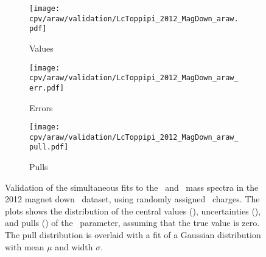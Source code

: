 \begin{figure}
  \begin{subfigure}[t]{0.32\textwidth}
    \texttt{[image: cpv/araw/validation/LcToppipi\_2012\_MagDown\_araw.pdf]}
    \caption{Values}
    \label{fig:cpv:araw:validation:null:ppipi:values}
  \end{subfigure}
  \begin{subfigure}[t]{0.32\textwidth}
    \texttt{[image: cpv/araw/validation/LcToppipi\_2012\_MagDown\_araw\_err.pdf]}
    \caption{Errors}
    \label{fig:cpv:araw:validation:null:ppipi:errors}
  \end{subfigure}
  \begin{subfigure}[t]{0.32\textwidth}
    \texttt{[image: cpv/araw/validation/LcToppipi\_2012\_MagDown\_araw\_pull.pdf]}
    \caption{Pulls}
    \label{fig:cpv:araw:validation:null:ppipi:pulls}
  \end{subfigure}
  \caption{%
    Validation of the simultaneous fits to the \PLambdac\ and \APLambdac\ mass
    spectra in the 2012 magnet down \ppipi\ dataset, using randomly assigned
    \PLambdac\ charges.
    The plots shows the distribution of the central values
    (), uncertainties
    (), and pulls
    () of the \ARaw\ parameter,
    assuming that the true value is zero.
    The pull distribution is overlaid with a fit of a Gaussian distribution
    with mean $\mu$ and width $\sigma$.
  }
  \label{fig:cpv:araw:validation:null:ppipi}
\end{figure}

